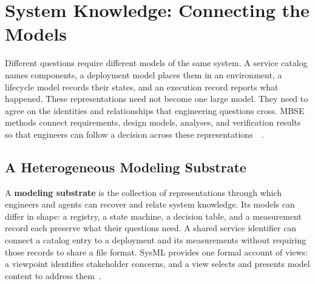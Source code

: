 


\chapter{System Knowledge: Connecting the Models}


Different questions require different models of the same system. A service catalog names components, a deployment model places them in an environment, a lifecycle model records their states, and an execution record reports what happened. These representations need not become one large model. They need to agree on the identities and relationships that engineering questions cross. MBSE methods connect requirements, design models, analyses, and verification results so that engineers can follow a decision across these representations~\citep{estefan2008mbse}~\citep{madni2018mbse}.

\section{A Heterogeneous Modeling Substrate}\label{heading:a-heterogeneous-modeling-substrate}



A \textbf{modeling substrate} is the collection of representations through which engineers and agents can recover and relate system knowledge. Its models can differ in shape: a registry, a state machine, a decision table, and a measurement record each preserve what their questions need. A shared service identifier can connect a catalog entry to a deployment and its measurements without requiring those records to share a file format. SysML provides one formal account of views: a viewpoint identifies stakeholder concerns, and a view selects and presents model content to address them~\citep{omg2025sysml}.

